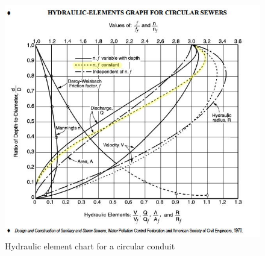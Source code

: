 \documentclass[11pt]{article}
\begin{document}
\begin{figure}[h!] %
   \centering
   \includegraphics[width=6in]{hydraulic-element-chart.jpg} 
   \caption{Hydraulic element chart for a circular conduit}
   \label{fig:hydraulic-element-chart.jpg}
\end{figure}
~\newline
~\newline
~\newline
~\newline
~\newline
~\newline
~\newline
~\newline
~\newline
~\newline
\end{document}
